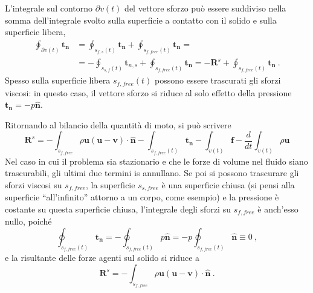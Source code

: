 L'integrale sul contorno $\partial v(t)$ del vettore sforzo può essere suddiviso nella somma dell'integrale svolto sulla superficie a contatto con il solido e sulla superficie libera,
\begin{equation}
\begin{aligned}
 \oint_{\partial v(t)} \bm{t_n} & = 
 \oint_{s_{f,s}(t)} \bm{t_n} + \oint_{s_{f,free}(t)} \bm{t_n} = \\
 & = - \oint_{s_{s,f}(t)} \bm{t}_{n,s} + \oint_{s_{f,free}(t)} \bm{t_n} =
 -\bm{R}^s + \oint_{s_{f,free}(t)} \bm{t_n} \ .
\end{aligned}
\end{equation}
Spesso sulla superficie libera $s_{f,free}(t)$ possono essere trascurati gli sforzi viscosi: in questo caso, il vettore sforzo si riduce al solo effetto della pressione $\bm{t_n} = -p \bm{\hat{n}}$.

Ritornando al bilancio della quantità di moto, si può scrivere
\begin{equation}
 \bm{R}^s = - \int_{s_{f,free}} \rho \bm{u} (\bm{u}-\bm{v}) \cdot \bm{\hat{n}}
 - \int_{s_{f,free}(t)} \bm{t_n}
 - \int_{v(t)} \bm{f} - \dfrac{d}{dt} \int_{v(t)} \rho \bm{u}
\end{equation}
Nel caso in cui il problema sia stazionario e che le forze di volume nel fluido siano trascurabili, gli ultimi due termini is annullano. Se poi si possono trascurare gli sforzi viscosi su $s_{f,free}$, la superficie $s_{s,free}$ è una superficie chiusa (si pensi alla superficie ``all'infinito'' attorno a un corpo, come esempio) e la pressione è costante su questa superficie chiusa, l'integrale degli sforzi su $s_{f,free}$ è anch'esso nullo, poiché
\begin{equation}
 \oint_{s_{f,free}(t)} \bm{t_n} = - \oint_{s_{f,free}(t)} p \bm{\hat{n}} = - p \oint_{s_{f,free}(t)} \bm{\hat{n}} \equiv 0 \ ,
\end{equation}
e la risultante delle forze agenti sul solido si riduce a
\begin{equation}
 \bm{R}^s = - \int_{s_{f,free}} \rho \bm{u} (\bm{u}-\bm{v}) \cdot \bm{\hat{n}} \ .
\end{equation}

